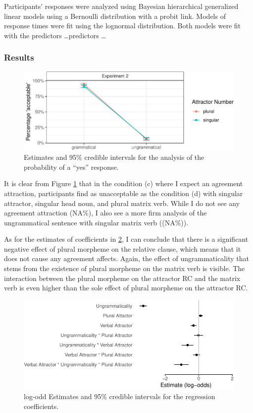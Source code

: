 \documentclass[english,doc]{apa6}
\begin{document}
Participants' responses were analyzed using Bayesian hierarchical generalized linear models using a Bernoulli distribution with a probit link. Models of response times were fit using the lognormal distribution. Both models were fit with the predictors
\ldots predictors \ldots

\hypertarget{results-1}{%
\subsubsection{Results}\label{results-1}}

\begin{figure}
\centering
\includegraphics{paper_draft_files/figure-latex/exp2AvgResponse-1.pdf}
\caption{\label{fig:exp2AvgResponse}Estimates and 95\% credible intervals for the analysis of the probability of a \enquote{yes} response.}
\end{figure}

It is clear from Figure \ref{fig:exp2AvgResponse} that in the condition (c) where I expect an agreement attraction, participants find as unacceptable as the condition (d) with singular attractor, singular head noun, and plural matrix verb. While I do not see any agreement attraction (NA\%), I also see a more firm analysis of the ungrammatical sentence with singular matrix verb ((NA\%)).

As for the estimates of coefficients in \ref{fig:exp2ResponseModelPlot}, I can conclude that there is a significant negative effect of plural morpheme on the relative clause, which means that it does not cause any agreement affects. Again, the effect of ungrammaticality that stems from the existence of plural morpheme on the matrix verb is visible. The interaction between the plural morpheme on the attractor RC and the matrix verb is even higher than the sole effect of plural morpheme on the attractor RC.

\begin{figure}
\centering
\includegraphics{paper_draft_files/figure-latex/exp2ResponseModelPlot-1.pdf}
\caption{\label{fig:exp2ResponseModelPlot}log-odd Estimates and 95\% credible intervals for the regression coefficients.}
\end{figure}
\end{document}
